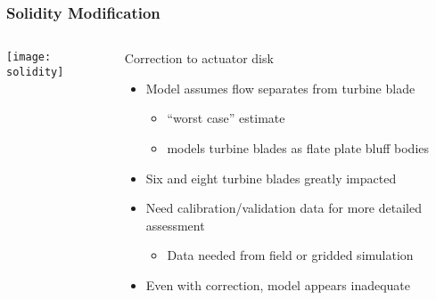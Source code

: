 \documentclass[mathserif]{beamer}
\begin{document}
%
%
\begin{frame}
 \frametitle{Solidity Modification}


 \begin{columns}[]
  \begin{column}{0.5\linewidth}


   \begin{center}
    \texttt{[image: solidity]}
   \end{center}

  \end{column}
  \begin{column}{0.5\linewidth}
   
   \begin{block}{Correction to actuator disk}
    \begin{itemize}
     \item Model assumes flow separates from turbine blade
	   \begin{itemize}
	    \item ``worst case'' estimate
	    \item models turbine blades as flate plate bluff bodies
	   \end{itemize}
     \item Six and eight turbine blades greatly impacted
     \item Need calibration/validation data for more detailed assessment  
	   \begin{itemize}
	    \item Data needed from field or gridded simulation
	   \end{itemize}
     \item Even with correction, model appears inadequate
    \end{itemize}

   \end{block}
  \end{column}
 \end{columns}

\end{frame}



%
%
\end{document}
